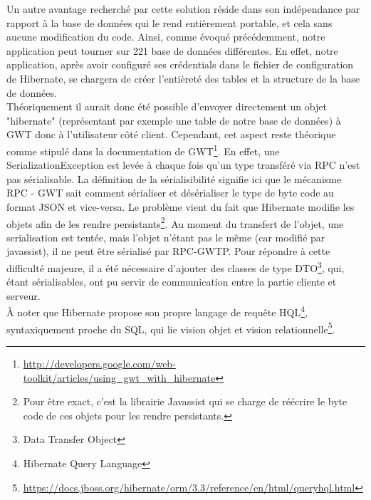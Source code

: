 Un autre avantage recherché par cette solution réside dans son indépendance par rapport à la base de données qui le rend entièrement portable, et cela sans aucune modification du code. Ainsi, comme évoqué précédemment, notre application peut tourner sur 221 base de données différentes.  En effet, notre application, après avoir configuré ses crédentials dans le fichier de configuration de Hibernate, se chargera de créer l’entièreté des tables et la structure de la base de données.\\
 \newline
 \indent
Théoriquement il aurait donc été possible d'envoyer directement un objet "hibernate" (représentant par exemple une table de notre base de données) à GWT donc à l'utilisateur côté client. Cependant, cet aspect reste théorique comme stipulé dans la documentation de GWT\footnote{\url{http://developers.google.com/web-toolkit/articles/using\_gwt\_with\_hibernate}}.
\newline
\indent
En effet, une SerializationException est levée à chaque fois qu'un type transféré via RPC n'est pas sérialisable. La définition de la sérialisibilité signifie ici que le mécanisme RPC - GWT sait comment sérialiser et désérialiser le type de byte code au format JSON et vice-versa.
\newline
\indent
Le problème vient du fait que Hibernate modifie les objets afin de les rendre persistants\footnote{Pour être exact, c'est la librairie Javassist qui se charge de réécrire le byte code de ces objets pour les rendre persistants.}. Au moment du transfert de l'objet, une serialisation est tentée, mais l'objet n'étant pas le même (car modifié par javassist), il ne peut être sérialisé par RPC-GWTP.
\newline
\indent
Pour répondre à cette difficulté majeure, il a été nécessaire d'ajouter des classes de type DTO\footnote{Data Transfer Object}, qui, étant sérialisables, ont pu servir de communication entre la partie cliente et serveur.\\
\newline
\indent
À noter que Hibernate propose son propre langage de requête HQL\footnote{Hibernate Query Language}, syntaxiquement proche du SQL, qui lie vision objet et vision relationnelle\footnote{\url{https://docs.jboss.org/hibernate/orm/3.3/reference/en/html/queryhql.html}}. 


